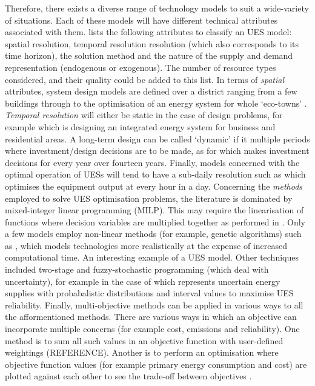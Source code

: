Therefore, there exists a diverse range of technology models to suit a wide-variety of situations. Each of these models will have different technical attributes associated with them. \citet{Kierstead2012b} lists the following attributes to classify an UES model: spatial resolution, temporal resolution resolution (which also corresponds to its time horizon), the solution method and the nature of the supply and demand representation (endogenous or exogenous). The number of resource types considered, and their quality could be added to this list. In terms of \emph{spatial} attributes, system design models are defined over a district ranging from a few buildings \citep{Bojic2010} through to the optimisation of an energy system for whole `eco-towns' \citep{Keirstead2012}. \emph{Temporal resolution} will either be static in the case of design problems, for example \citet{Sugihara2004} which is designing an integrated energy system for business and residential areas. A long-term design can be called `dynamic' if it multiple periods where investment/design decisions are to be made, as for \citet{Siriputtisak2009} which makes investment decisions for every year over fourteen years. Finally, models concerned with the optimal operation of UESs will tend to have a sub-daily resolution such as \citet{Ooka2009} which optimises the equipment output at every hour in a day. Concerning the \emph{methods} employed to solve UES optimisation problems, the literature is dominated by mixed-integer linear programming (MILP). This may require the linearisation of functions where decision variables are multiplied together as performed in \citet{Siriputtisak2009}. Only a few models employ non-linear methods (for example, genetic algorithms) such as \citet{Ooka2009}, which models technologies more realistically at the expense of increased computational time. An interesting example of a UES model. Other techniques included two-stage and fuzzy-stochastic programming (which deal with uncertainty), for example in the case of \citet{Cai2009a} which represents uncertain energy supplies with probabalistic distributions and interval values to maximise UES reliability. Finally, multi-objective methods can be applied in various ways to all the afformentioned methods. There are various ways in which an objective can incorporate multiple concerns (for example cost, emissions and reliability). One method is to sum all such values in an objective function with user-defined weightings (REFERENCE). Another is to perform an optimisation where objective function values (for example primary energy consumption and cost) are plotted against each other to see the trade-off between objectives \citep{Sugihara2004}.

